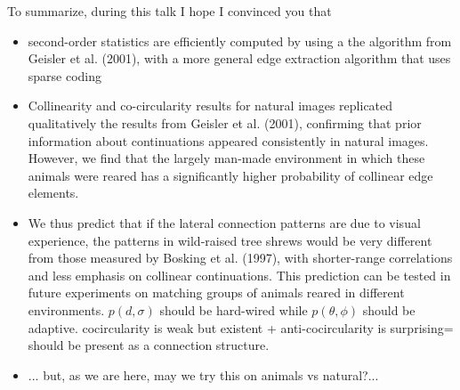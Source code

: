 \documentclass[10pt,ignorenonframetext]{beamer}%
\begin{document}
{{%
To summarize, during this talk  I hope I convinced you that 
	\begin{itemize}
		\item  \odot second-order statistics are efficiently computed by using a the algorithm from Geisler et al. (2001), with a more general edge extraction algorithm that uses sparse coding %
		\item \odot Collinearity and co-circularity results for natural images replicated qualitatively the results from Geisler et al. (2001), confirming that prior information about continuations appeared consistently in natural images. However, we find that the largely man-made environment in which these animals were reared has a significantly higher probability of collinear edge elements. %
		\item \odot We thus predict that if the lateral connection patterns are due to visual experience, the patterns in wild-raised tree shrews would be very different from those measured by Bosking et al. (1997), with shorter-range correlations and less emphasis on collinear continuations. This prediction can be tested in future experiments on matching groups of animals reared in different environments. $p(d,\sigma)$ should be hard-wired while $p(\theta, \phi)$ should be adaptive. cocircularity is weak but existent + anti-cocircularity is surprising= should be present as a connection structure. %
		\item ... but, as we are here, may we try this on animals vs natural?...
	\end{itemize}
	} %
}
\end{document}
